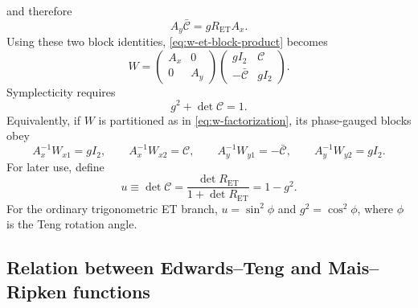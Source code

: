\documentclass[11pt,a4paper]{article}
\begin{document}
and therefore
\begin{equation}
 A_y\bar{\mathcal C}=g R_{\mathrm{ET}}A_x.
\end{equation}
Using these two block identities, \cref{eq:w-et-block-product} becomes
\begin{equation}
 \boxed{
 W=
 \begin{pmatrix}A_x&0\\0&A_y\end{pmatrix}
 \begin{pmatrix}
  g I_2&\mathcal C\\
  -\bar{\mathcal C}&g I_2
 \end{pmatrix}.
 }
 \label{eq:w-factorization}
\end{equation}
Symplecticity requires
\begin{equation}
 g^2+\det\mathcal C=1.
 \label{eq:g-c-condition}
\end{equation}
Equivalently, if $W$ is partitioned as in \cref{eq:w-factorization}, its
phase-gauged blocks obey
\begin{equation}
 \boxed{
 A_x^{-1}W_{x1}=g I_2,\qquad
 A_x^{-1}W_{x2}=\mathcal C,\qquad
 A_y^{-1}W_{y1}=-\bar{\mathcal C},\qquad
 A_y^{-1}W_{y2}=g I_2.
 }
 \label{eq:w-blocks-normalized}
\end{equation}
For later use, define
\begin{equation}
 u\equiv\det\mathcal C
 =\frac{\det R_{\mathrm{ET}}}{1+\det R_{\mathrm{ET}}}
 =1-g^2.
 \label{eq:u-def}
\end{equation}
For the ordinary trigonometric ET branch, $u=\sin^2\phi$ and
$g^2=\cos^2\phi$, where $\phi$ is the Teng rotation angle.

\subsection{Relation between Edwards--Teng and Mais--Ripken functions}
\end{document}

